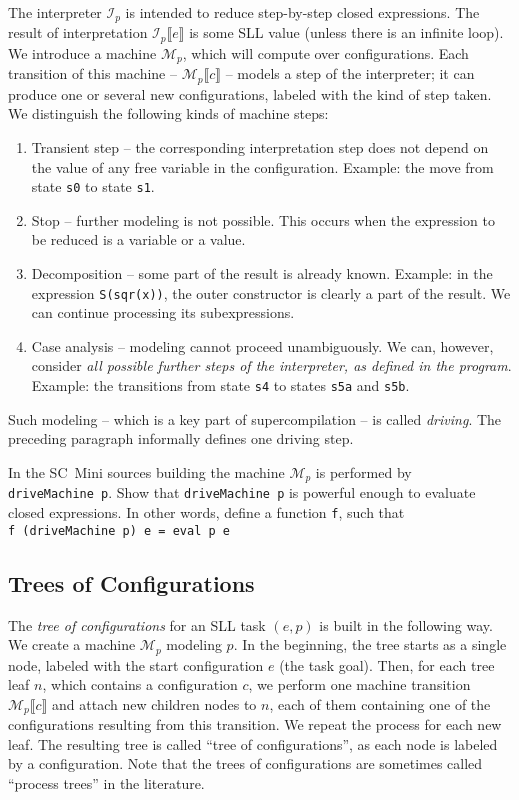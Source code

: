 The interpreter $\mathcal{I}_p$ is intended to reduce step-by-step closed expressions. 
The result of interpretation $\mathcal{I}_p\llbracket e \rrbracket$ is some SLL value (unless there is an infinite loop).
We introduce a machine $\mathcal{M}_p$, which will compute over configurations. 
Each transition of this machine -- $\mathcal{M}_p \llbracket c \rrbracket$ -- models a step of the interpreter;
it can produce one or several new configurations, labeled with the kind of step taken.
We distinguish the following kinds of machine steps:
\begin{enumerate}
  \item Transient step -- the corresponding interpretation step does not depend on
  the value of any free variable in the configuration.
  Example: the move from state \texttt{s0} to state \texttt{s1}.
  \item Stop -- further modeling is not possible. 
  This occurs when the expression to be reduced is a variable or a value.
  \item Decomposition -- some part of the result is already known.
  Example: in the expression \texttt{S(sqr(x))},
  the outer constructor is clearly a part of the result. 
  We can continue processing its subexpressions.
  \item Case analysis -- modeling cannot proceed unambiguously.
  We can, however, consider \emph{all possible further steps of the interpreter, as defined in the program}.
  Example: the transitions from state \texttt{s4} to states \texttt{s5a} and \texttt{s5b}.
\end{enumerate}

Such modeling -- which is a key part of supercompilation -- is called \emph{driving}. 
The preceding paragraph informally defines one driving step.

\begin{exercise}
In the SC~Mini sources building the machine $\mathcal{M}_p$ is performed by \texttt{driveMachine~p}.
Show that \texttt{driveMachine~p} is powerful enough to evaluate closed expressions. 
In other words, define a function \texttt{f}, such that
\\ \texttt{f (driveMachine p) e = eval p e}
\end{exercise}

\subsection{Trees of Configurations}

The \emph{tree of configurations} for an SLL task $(e, p)$ is built in the following way.
We create a machine $\mathcal{M}_p$ modeling $p$.
In the beginning, the tree starts as a single node, labeled with the start configuration $e$ (the task goal).
Then, for each tree leaf $n$, which contains a configuration $c$, 
we perform one machine transition $\mathcal{M}_p \llbracket c \rrbracket$ and attach new children nodes to $n$,
each of them containing one of the configurations resulting from this transition.
We repeat the process for each new leaf. 
The resulting tree is called ``tree of configurations'', as each node is labeled by a configuration.
Note that the trees of configurations are sometimes called ``process trees'' in the literature.

